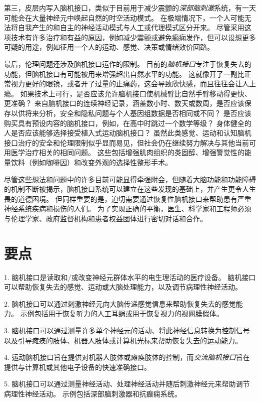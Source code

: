 第三，皮层内写入脑机接口，类似于目前用于减少震颤的\textit{深部脑刺激}系统，有一天可能会在大量神经元中唤起自然的时空活动模式。
在极端情况下，一个人可能无法将自我产生的和自主的神经活动模式与人工或代理模式区分开来。
尽管采用这项技术有许多治疗和有益的原因，例如减少震颤或避免癫痫发作，但可以设想更多可疑的用途，例如征用一个人的运动、感觉、决策或情绪效价回路。


最后，伦理问题还涉及脑机接口运作的限制。
目前的\textit{脑机接口}专注于恢复失去的功能，但脑机接口有可能被用来增强超出自然水平的功能。
这就像开了一副比正常视力更好的眼镜，或者开了过量的止痛药，这会导致欣快感，而且往往会让人上瘾。
如果技术上可行，是否应该允许脑机接口使机械臂比自然手臂移动得更快、更准确？
来自脑机接口的连续神经记录，涵盖数小时、数天或数周，是否应该保存以供将来分析，安全和隐私问题与个人基因组数据是否相同或不同？
是否应该购买具有预设内容的脑机接口，例如，在高中时跳过一个数学等级？
身体健全的人是否应该能够选择接受植入式运动脑机接口？
虽然此类感觉、运动和认知脑机接口治疗的安全和伦理限制似乎显而易见，但社会仍在继续努力解决与其他当前可用医学治疗相关的相同问题。
这些包括增强肌肉组织的类固醇、增强警觉性的能量饮料（例如咖啡因）和改变外观的选择性整形手术。


尽管这些想法和问题中的许多目前可能显得牵强附会，但随着大脑功能和功能障碍的机制不断被揭示，脑机接口系统可以建立在这些发现的基础上，并产生更令人生畏的道德困境。
但同样重要的是，迫切需要通过恢复性脑机接口来帮助患有严重神经系统疾病和损伤的人们。
为了实现正确的平衡，医生、科学家和工程师必须与伦理学家、政府监督机构和患者权益团体进行密切对话和合作。



\section{要点}

1. 脑机接口是读取和/或改变神经元群体水平的电生理活动的医疗设备。
脑机接口可以帮助恢复失去的感觉、运动或大脑处理能力，以及调节病理性神经活动。


2. 脑机接口可以通过刺激神经元向大脑传递感觉信息来帮助恢复失去的感觉能力。
示例包括用于恢复听力的人工耳蜗或用于恢复视力的视网膜假体。


3. 脑机接口可以通过测量许多单个神经元的活动、将此神经信息转换为控制信号以及引导瘫痪的肢体、机器人肢体或计算机光标来帮助恢复失去的运动能力。


4. 运动脑机接口旨在提供对机器人肢体或瘫痪肢体的控制，而\textit{交流脑机接口}旨在提供与计算机或其他电子设备的快速准确接口。


5. 脑机接口可以通过测量神经活动、处理神经活动并随后刺激神经元来帮助调节病理性神经活动。
示例包括深部脑刺激器和抗癫痫系统。


